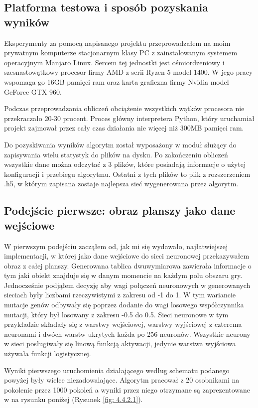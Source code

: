 \documentclass[12pt, oneside, a4paper]{report}
\begin{document}
\subsection{Platforma testowa i sposób pozyskania wyników}

Eksperymenty za pomocą napisanego projektu przeprowadzałem na moim prywatnym komputerze stacjonarnym klasy PC z zainstalowanym systemem operacyjnym Manjaro Linux. Sercem tej jednostki jest ośmiordzeniowy i szesnastowątkowy procesor firmy AMD z serii Ryzen 5 model 1400. W jego pracy wspomaga go 16GB pamięci ram oraz karta graficzna firmy Nvidia model GeForce GTX 960.

Podczas przeprowadzania obliczeń obciążenie wszystkich wątków procesora nie przekraczało 20-30 procent. Proces główny interpretera Python, który uruchamiał projekt zajmował przez cały czas działania nie więcej niż 300MB pamięci ram.

Do pozyskiwania wyników algorytm został wyposażony w moduł służący do zapisywania wielu statystyk do plików na dysku. Po zakończeniu obliczeń wszystkie dane można odczytać z 3 plików, które posiadają informacje o użytej konfiguracji i przebiegu algorytmu. Ostatni z tych plików to plik z rozszerzeniem .h5, w którym zapisana zostaje najlepsza sieć wygenerowana przez algorytm.

\subsection{Podejście pierwsze: obraz planszy jako dane wejściowe}

W pierwszym podejściu zacząłem od, jak mi się wydawało, najłatwiejszej implementacji, w której jako dane wejściowe do sieci neuronowej przekazywałem obraz z całej planszy. Generowana tablica dwuwymiarowa zawierała informacje o tym jaki obiekt znajduje się w danym momencie na każdym polu obszaru gry. Jednocześnie podjąłem decyzję aby wagi połączeń neuronowych w generowanych sieciach były liczbami rzeczywistymi z zakresu od -1 do 1. W tym wariancie mutacje genów odbywały się poprzez dodanie do wagi losowego współczynnika mutacji, który był losowany z zakresu -0.5 do 0.5. Sieci neuronowe w tym przykładzie składały się z warstwy wejściowej, warstwy wyjściowej z czterema neuronami i dwóch warstw ukrytych każda po 256 neuronów. Wszystkie neurony w sieci posługiwały się linową funkcją aktywacji, jedynie warstwa wyjściowa używała funkcji logistycznej.

Wyniki pierwszego uruchomienia działającego według schematu podanego powyżej były wielce niezadowalające.
Algorytm pracował z 20 osobnikami na pokolenie przez 1000 pokoleń a wyniki przez niego otrzymane są zaprezentowane w na rysunku poniżej (Rysunek \ref{fig: 4.4.2.1}).
\end{document}

